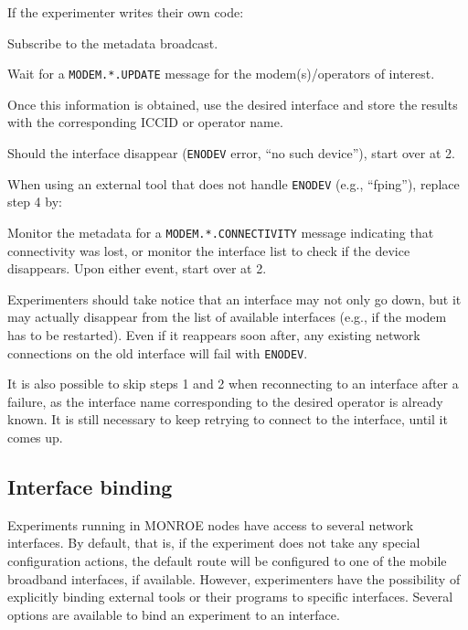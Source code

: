 \documentclass[a4paper,10pt]{article}
\newcommand{\monroe}{MONROE}
\newcommand{\identifier}[1]{{\texttt{\small{#1}}}}
\begin{document}
If the experimenter writes their own code:
\begin{enumerate*}
	\item Subscribe to the metadata broadcast.
	\item Wait for a \identifier{MODEM.*.UPDATE} message for the modem(s)/operators of interest.
	\item Once this information is obtained, use the desired interface and store the results with the corresponding ICCID or operator name.
	\item Should the interface disappear (\identifier{ENODEV} error, ``no such device''), start over at 2.
\end{enumerate*}
	
When using an external tool that does not handle \identifier{ENODEV} (e.g., ``fping''), replace step 4 by:
\begin{itemize*}
	\item Monitor the metadata for a \identifier{MODEM.*.CONNECTIVITY} message indicating that connectivity was lost, or monitor the interface list to check if the device disappears. Upon either event, start over at 2.
\end{itemize*}
	
Experimenters should take notice that an interface may not only go down, but it may actually disappear from the list of available interfaces (e.g., if the modem has to be restarted).
Even if it reappears soon after, any existing network connections on the old interface will fail with \identifier{ENODEV}. 
	
It is also possible to skip steps 1 and 2 when reconnecting to an interface after a failure, as the interface name corresponding to the desired operator is already known.
It is still necessary to keep retrying to connect to the interface, until it comes up.

\subsection{Interface binding}
\label{subsec:binding}

Experiments running in \monroe{} nodes have access to several network interfaces.
By default, that is, if the experiment does not take any special configuration actions, the default route will be configured to one of the mobile broadband interfaces, if available.
However, experimenters have the possibility of explicitly binding external tools or their programs to specific interfaces.
Several options are available to bind an experiment to an interface.
\end{document}
